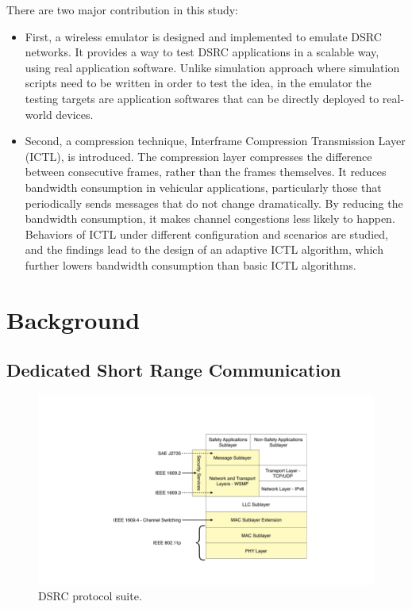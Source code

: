 \documentclass[12pt]{report}
\begin{document}
There are two major contribution in this study:
\begin{itemize}
  \item First, a wireless emulator is designed and implemented to emulate DSRC networks. It provides a way to test DSRC applications in a scalable way, using real application software. Unlike simulation approach where simulation scripts need to be written in order to test the idea, in the emulator the testing targets are application softwares that can be directly deployed to real-world devices.
  \item Second, a compression technique, Interframe Compression Transmission Layer (ICTL), is introduced. The compression layer compresses the difference between consecutive frames, rather than the frames themselves. It reduces bandwidth consumption in vehicular applications, particularly those that periodically sends messages that do not change dramatically. By reducing the bandwidth consumption, it makes channel congestions less likely to happen. Behaviors of ICTL under different configuration and scenarios are studied, and the findings lead to the design of an adaptive ICTL algorithm, which further lowers bandwidth consumption than basic ICTL algorithms.
\end{itemize}

\chapter{Background}

\section{Dedicated Short Range Communication}

\begin{figure}[htb]
  \begin{center}
    \includegraphics[width=.7\columnwidth]{figures/dsrc.pdf}
    \caption{\label{fig:dsrc}DSRC protocol suite.}
  \end{center}
\end{figure}
\end{document}
